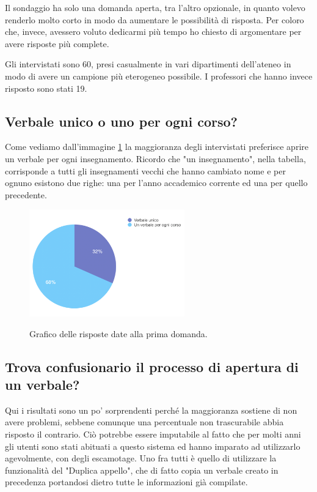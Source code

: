 \documentclass[Lau, oneside, noexaminfo]{sapthesis}%
\begin{document}
Il sondaggio ha solo una domanda aperta, tra l'altro opzionale, in quanto volevo renderlo molto corto in modo da aumentare le possibilità di risposta. Per coloro che, invece, avessero voluto dedicarmi più tempo ho chiesto di argomentare per avere risposte più complete. 

Gli intervistati sono 60, presi casualmente in vari dipartimenti dell'ateneo in modo di avere un campione più eterogeneo possibile. I professori che hanno invece risposto sono stati 19.

\subsection{Verbale unico o uno per ogni corso?}

Come vediamo dall'immagine \ref{fig:d-i} la maggioranza degli intervistati preferisce aprire un verbale per ogni insegnamento. Ricordo che "un insegnamento", nella tabella, corrisponde a tutti gli insegnamenti vecchi che hanno cambiato nome e per ognuno esistono due righe: una per l'anno accademico corrente ed una per quello precedente.

\begin{figure}[H]
	\caption{Grafico delle risposte date alla prima domanda.}
	\centering
	\includegraphics[width=0.6\textwidth]{d-i.png}
	\label{fig:d-i}
\end{figure}

\subsection{Trova confusionario il processo di apertura di un verbale?}
Qui i risultati sono un po' sorprendenti perché la maggioranza sostiene di non avere problemi, sebbene comunque una percentuale non trascurabile abbia risposto il contrario. Ciò potrebbe essere imputabile al fatto che per molti anni gli utenti sono stati abituati a questo sistema ed hanno imparato ad utilizzarlo agevolmente, con degli escamotage. Uno fra tutti è quello di utilizzare la funzionalità del "Duplica appello", che di fatto copia un verbale creato in precedenza portandosi dietro tutte le informazioni già compilate.
\end{document}
